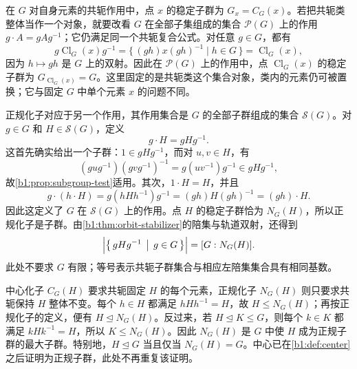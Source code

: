 \ProseParagraphBreak
在 \(G\) 对自身元素的共轭作用中，点 \(x\) 的稳定子群为 \(G_x=C_G(x)\)。若把共轭类整体当作一个对象，就要改看 \(G\) 在全部子集组成的集合 \(\mathcal P(G)\) 上的作用 \(g\cdot A=gAg^{-1}\)；它仍满足同一个共轭复合公式。对任意 \(g\in G\)，都有
\[
	g\operatorname{Cl}_G(x)g^{-1} =\bigl\{\,(gh)x(gh)^{-1}\mid h\in G\,\bigr\} =\operatorname{Cl}_G(x),
\]
因为 \(h\mapsto gh\) 是 \(G\) 上的双射。因此在 \(\mathcal P(G)\) 上的作用中，点 \(\operatorname{Cl}_G(x)\) 的稳定子群为 \(G_{\operatorname{Cl}_G(x)}=G\)。这里固定的是共轭类这个集合对象，类内的元素仍可被置换；它与固定 \(G\) 中单个元素 \(x\) 的问题不同。

\ProseParagraphBreak
正规化子对应于另一个作用，其作用集合是 \(G\) 的全部子群组成的集合 \(\mathcal S(G)\)。对 \(g\in G\) 和 \(H\in\mathcal S(G)\)，定义
\[
	g\cdot H=gHg^{-1}.
\]
这首先确实给出一个子群：\(1\in gHg^{-1}\)，而对 \(u,v\in H\)，有
\[
	(gug^{-1})(gvg^{-1})^{-1}=g(uv^{-1})g^{-1}\in gHg^{-1},
\]
故\cref{b1:prop:subgroup-test}适用。其次，\(1\cdot H=H\)，并且
\[
	g\cdot(h\cdot H)=g(hHh^{-1})g^{-1}=(gh)H(gh)^{-1}=(gh)\cdot H.
\]
因此这定义了 \(G\) 在 \(\mathcal S(G)\) 上的作用。点 \(H\) 的稳定子群恰为 \(N_G(H)\)，所以正规化子是子群。由\cref{b1:thm:orbit-stabilizer}的陪集与轨道双射，还得到
\[
	\Bigl|\bigl\{\,gHg^{-1}\,\bigm|\,g\in G\,\bigr\}\Bigr|=[G:N_G(H)].
\]
此处不要求 \(G\) 有限；等号表示共轭子群集合与相应左陪集集合具有相同基数。

\ProseParagraphBreak
中心化子 \(C_G(H)\) 要求共轭固定 \(H\) 的每个元素，正规化子 \(N_G(H)\) 则只要求共轭保持 \(H\) 整体不变。每个 \(h\in H\) 都满足 \(hHh^{-1}=H\)，故 \(H\leq N_G(H)\)；再按正规化子的定义，便有 \(H\trianglelefteq N_G(H)\)。反过来，若 \(H\trianglelefteq K\leq G\)，则每个 \(k\in K\) 都满足 \(kHk^{-1}=H\)，所以 \(K\leq N_G(H)\)。因此 \(N_G(H)\) 是 \(G\) 中使 \(H\) 成为正规子群的最大子群。特别地，\(H\trianglelefteq G\) 当且仅当 \(N_G(H)=G\)。中心已在\cref{b1:def:center}之后证明为正规子群，此处不再重复该证明。

